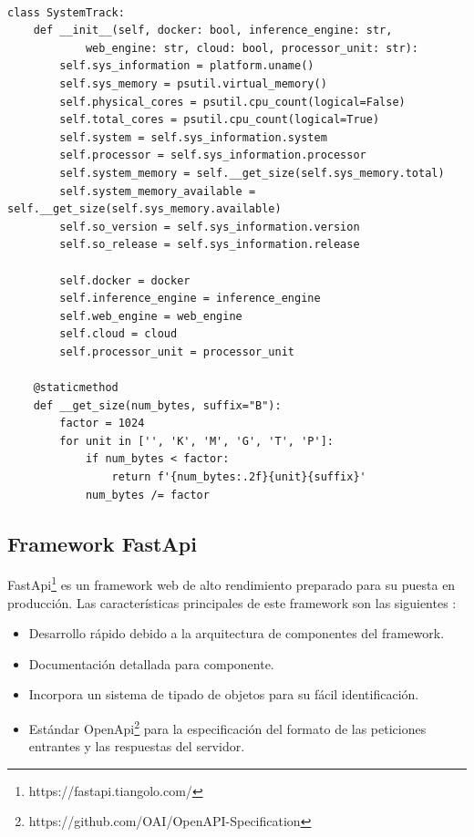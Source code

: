 \begin{lstlisting}[caption=Clase Python para generar información sobre el sistema,label=class2,float=h]

class SystemTrack:
    def __init__(self, docker: bool, inference_engine: str, 
            web_engine: str, cloud: bool, processor_unit: str):
        self.sys_information = platform.uname()
        self.sys_memory = psutil.virtual_memory()
        self.physical_cores = psutil.cpu_count(logical=False)
        self.total_cores = psutil.cpu_count(logical=True)
        self.system = self.sys_information.system
        self.processor = self.sys_information.processor
        self.system_memory = self.__get_size(self.sys_memory.total)
        self.system_memory_available = self.__get_size(self.sys_memory.available)
        self.so_version = self.sys_information.version
        self.so_release = self.sys_information.release

        self.docker = docker
        self.inference_engine = inference_engine
        self.web_engine = web_engine
        self.cloud = cloud
        self.processor_unit = processor_unit

    @staticmethod
    def __get_size(num_bytes, suffix="B"):
        factor = 1024
        for unit in ['', 'K', 'M', 'G', 'T', 'P']:
            if num_bytes < factor:
                return f'{num_bytes:.2f}{unit}{suffix}'
            num_bytes /= factor
\end{lstlisting}
\subsection{Framework FastApi}\label{subsec:framework-fastapi}
FastApi\footnote{https://fastapi.tiangolo.com/} es un framework web de alto rendimiento preparado para su puesta en producción.
Las características principales de este framework son las siguientes :

\begin{itemize}
    \item Desarrollo rápido debido a la arquitectura de componentes del framework.
    \item Documentación detallada para componente.
    \item Incorpora un sistema de tipado de objetos para su fácil identificación.
    \item Estándar OpenApi\footnote{https://github.com/OAI/OpenAPI-Specification} para la especificación del formato de las peticiones entrantes y las respuestas del servidor.
\end{itemize}

